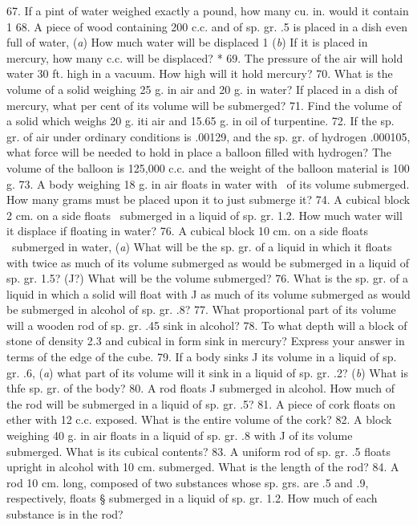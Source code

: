67. If a pint of water weighed exactly a pound, how many cu. in. would it contain 1
68. A piece of wood containing 200 c.c. and of sp. gr. .5 is placed in a dish even full of water, (\emph{a}) How much water will be displaced 1 (\emph{b}) If it is placed in mercury, how many c.c. will be displaced? *
69. The pressure of the air will hold water 30 ft. high in a vacuum. How high will it hold mercury?
70. What is the volume of a solid weighing 25 g. in air and 20 g. in water? If placed in a dish of mercury, what per cent of its volume will be submerged?
71. Find the volume of a solid which weighs 20 g. iti air and 15.65 g. in oil of turpentine.
72. If the sp. gr. of air under ordinary conditions is .00129, and the sp. gr. of hydrogen .000105, what force will be needed to hold in place a balloon filled with hydrogen? The volume of the balloon is 125,000 c.c. and the weight of the balloon material is 100 g.
73. A body weighing 18 g. in air floats in water with \ of its volume submerged. How many grams must be placed upon it to just submerge it?
74. A cubical block 2 cm. on a side floats \ submerged in a liquid of sp. gr. 1.2. How much water will it displace if floating in water?
76. A cubical block 10 cm. on a side floats \ submerged in water, (\emph{a}) What will be the sp. gr. of a liquid in which it floats with twice as much of its volume submerged as would be submerged in a liquid of sp. gr. 1.5? (J?) What will be the volume submerged?
76. What is the sp. gr. of a liquid in which a solid will float with J as much of its volume submerged as would be submerged in alcohol of sp. gr. .8?
77. What proportional part of its volume will a wooden rod of sp. gr. .45 sink in alcohol?
78. To what depth will a block of stone of density 2.3 and cubical in form sink in mercury? Express your answer in terms of the edge of the cube.
79. If a body sinks J its volume in a liquid of sp. gr. .6, (\emph{a}) what part of its volume will it sink in a liquid of sp. gr. .2? (\emph{b}) What is thfe sp. gr. of the body?
80. A rod floats J submerged in alcohol. How much of the rod will be submerged in a liquid of sp. gr. .5?
81. A piece of cork floats on ether with 12 c.c. exposed. What is the entire volume of the cork?
82. A block weighing 40 g. in air floats in a liquid of sp. gr. .8 with J of its volume submerged. What is its cubical contents?
83. A uniform rod of sp. gr. .5 floats upright in alcohol with 10 cm. submerged. What is the length of the rod?
84. A rod 10 cm. long, composed of two substances whose sp. grs. are .5 and .9, respectively, floats § submerged in a liquid of sp. gr. 1.2. How much of each substance is in the rod?
